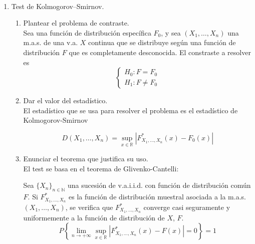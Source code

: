 \documentclass[12pt]{article}
\newcommand{\R}{\mathbb{R}}
\newcommand{\N}{\mathbb{N}}
\begin{document}
    \begin{ejercicio}~
        \begin{enumerate}
            \item[a)] Test de Kolmogorov--Smirnov.
            \begin{enumerate}
                \item[i)] Plantear el problema de contraste. \\
                
                Sea una función de distribución específica $F_0$, y sea $(X_1, \ldots, X_n)$ una m.a.s. de una v.a. $X$ continua que se distribuye
                según una función de distribución $F$ que es completamente desconocida. El constraste a resolver es
                $$\begin{cases}
                    H_0 : F = F_0 \\
                    H_1 : F \neq F_0
                \end{cases}$$

                \item[ii)] Dar el valor del estadístico. \\
                
                El estadístico que se usa para resolver el problema es el estadístico de Kolmogorov-Smirnov

                $$D(X_1, \ldots, X_n) = \sup_{x \in \R} |F_{X_1, \ldots, X_n}^{*}(x) - F_0(x)|$$

                \item[iii)] Enunciar el teorema que justifica su uso. \\
                
                El test se basa en el teorema de Glivenko-Cantelli: \\

                \begin{teo}
                    Sea $\{X_n\}_{n \in \N}$ una sucesión de v.a.i.i.d. con función de distribución común $F$. Si $F_{X_1, \ldots, X_n}^{*}$
                    es la función de distribución muestral asociada a la m.a.s. $(X_1, \ldots, X_n)$, se verifica que $F_{X_1, \ldots, X_n}^{*}$
                    converge casi seguramente y uniformemente a la función de distribución de $X$, $F$.
                    $$P \left\{ \lim\limits_{n \to +\infty} \sup_{x \in \R} |F_{X_1, \ldots, X_n}^{*}(x) - F(x)| = 0 \right\} = 1$$
                \end{teo}


\end{enumerate}
\end{enumerate}
\end{ejercicio}
\end{document}
